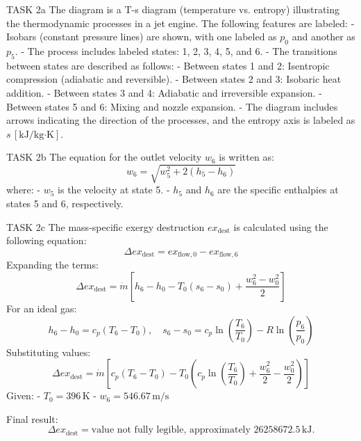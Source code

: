 TASK 2a  
The diagram is a T-s diagram (temperature vs. entropy) illustrating the thermodynamic processes in a jet engine. The following features are labeled:  
- Isobars (constant pressure lines) are shown, with one labeled as \( p_0 \) and another as \( p_5 \).  
- The process includes labeled states: 1, 2, 3, 4, 5, and 6.  
- The transitions between states are described as follows:  
  - Between states 1 and 2: Isentropic compression (adiabatic and reversible).  
  - Between states 2 and 3: Isobaric heat addition.  
  - Between states 3 and 4: Adiabatic and irreversible expansion.  
  - Between states 5 and 6: Mixing and nozzle expansion.  
- The diagram includes arrows indicating the direction of the processes, and the entropy axis is labeled as \( s \, [\text{kJ/kg·K}] \).  

TASK 2b  
The equation for the outlet velocity \( w_6 \) is written as:  
\[
w_6 = \sqrt{w_5^2 + 2 \left( h_5 - h_6 \right)}
\]  
where:  
- \( w_5 \) is the velocity at state 5.  
- \( h_5 \) and \( h_6 \) are the specific enthalpies at states 5 and 6, respectively.  

TASK 2c  
The mass-specific exergy destruction \( ex_{\text{dest}} \) is calculated using the following equation:  
\[
\Delta ex_{\text{dest}} = ex_{\text{flow},0} - ex_{\text{flow},6}
\]  
Expanding the terms:  
\[
\Delta ex_{\text{dest}} = \dot{m} \left[ h_6 - h_0 - T_0 \left( s_6 - s_0 \right) + \frac{w_6^2 - w_0^2}{2} \right]
\]  
For an ideal gas:  
\[
h_6 - h_0 = c_p \left( T_6 - T_0 \right), \quad s_6 - s_0 = c_p \ln \left( \frac{T_6}{T_0} \right) - R \ln \left( \frac{p_6}{p_0} \right)
\]  
Substituting values:  
\[
\Delta ex_{\text{dest}} = \dot{m} \left[ c_p \left( T_6 - T_0 \right) - T_0 \left( c_p \ln \left( \frac{T_6}{T_0} \right) + \frac{w_6^2}{2} - \frac{w_0^2}{2} \right) \right]
\]  
Given:  
- \( T_0 = 396 \, \text{K} \)  
- \( w_6 = 546.67 \, \text{m/s} \)  

Final result:  
\[
\Delta ex_{\text{dest}} = \text{value not fully legible, approximately } 26258672.5 \, \text{kJ}.
\]  